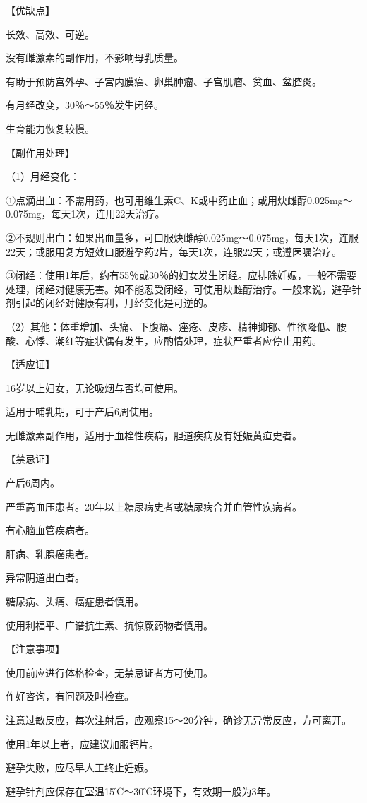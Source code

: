 \documentclass[12pt,UTF8,openany]{ctexbook}
\begin{document}
【优缺点】

长效、高效、可逆。

没有雌激素的副作用，不影响母乳质量。

有助于预防宫外孕、子宫内膜癌、卵巢肿瘤、子宫肌瘤、贫血、盆腔炎。

有月经改变，30％～55％发生闭经。

生育能力恢复较慢。

【副作用处理】

（1）月经变化：

①点滴出血：不需用药，也可用维生素C、K或中药止血；或用炔雌醇0.025mg～0.075mg，每天1次，连用22天治疗。

②不规则出血：如果出血量多，可口服炔雌醇0.025mg～0.075mg，每天1次，连服22天；或服用复方短效口服避孕药2片，每天1次，连服22天；或遵医嘱治疗。

③闭经：使用1年后，约有55％或30％的妇女发生闭经。应排除妊娠，一般不需要处理，闭经对健康无害。如不能忍受闭经，可使用炔雌醇治疗。一般来说，避孕针剂引起的闭经对健康有利，月经变化是可逆的。

（2）其他：体重增加、头痛、下腹痛、痤疮、皮疹、精神抑郁、性欲降低、腰酸、心悸、潮红等症状偶有发生，应酌情处理，症状严重者应停止用药。

【适应证】

16岁以上妇女，无论吸烟与否均可使用。

适用于哺乳期，可于产后6周使用。

无雌激素副作用，适用于血栓性疾病，胆道疾病及有妊娠黄疸史者。

【禁忌证】

产后6周内。

严重高血压患者。20年以上糖尿病史者或糖尿病合并血管性疾病者。

有心脑血管疾病者。

肝病、乳腺癌患者。

异常阴道出血者。

糖尿病、头痛、癌症患者慎用。

使用利福平、广谱抗生素、抗惊厥药物者慎用。

【注意事项】

使用前应进行体格检查，无禁忌证者方可使用。

作好咨询，有问题及时检查。

注意过敏反应，每次注射后，应观察15～20分钟，确诊无异常反应，方可离开。

使用1年以上者，应建议加服钙片。

避孕失败，应尽早人工终止妊娠。

避孕针剂应保存在室温15℃～30℃环境下，有效期一般为3年。
\end{document}
